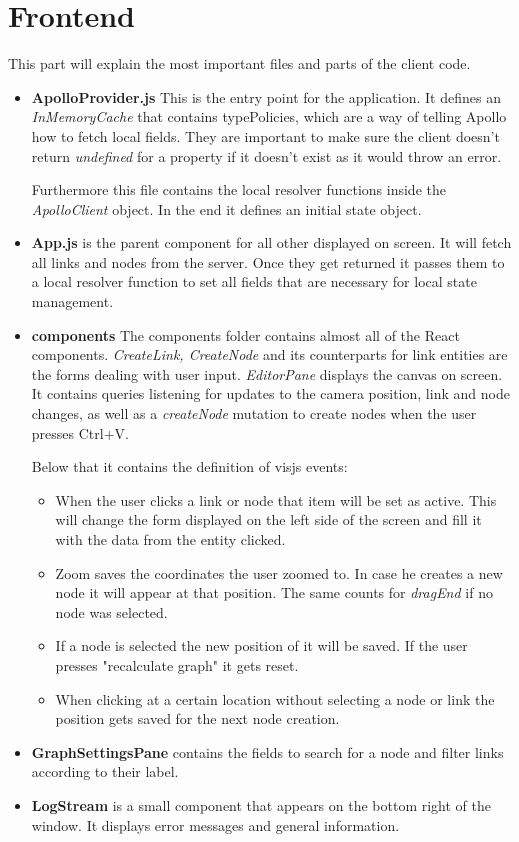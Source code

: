 \section{Frontend}
This part will explain the most important files and parts of the client code.
\begin{itemize}
\item \textbf{ApolloProvider.js} This is the entry point for the application. It defines an \emph{InMemoryCache} that contains typePolicies, which are a way of telling Apollo how to fetch local fields. They are important to make sure the client doesn't return \emph{undefined} for a property if it doesn't exist as it would throw an error.

Furthermore this file contains the local resolver functions inside the \emph{ApolloClient} object. In the end it defines an initial state object.

\item \textbf{App.js} is the parent component for all other displayed on screen. It will fetch all links and nodes from the server. Once they get returned it passes them to a local resolver function to set all fields that are necessary for local state management.

\item \textbf{components} The components folder contains almost all of the React components. \emph{CreateLink, CreateNode} and its counterparts for link entities are the forms dealing with user input. \emph{EditorPane} displays the canvas on screen. It contains queries listening for updates to the camera position, link and node changes, as well as a \emph{createNode} mutation to create nodes when the user presses Ctrl+V.

Below that it contains the definition of visjs events:
\begin{itemize}
\item When the user clicks a link or node that item will be set as active. This will change the form displayed on the left side of the screen and fill it with the data from the entity clicked.
\item  Zoom saves the coordinates the user zoomed to.  In case he creates a new node it will appear at that position. The same counts for \emph{dragEnd} if no node was selected.
\item If a node is selected the new position of it will be saved. If the user presses "recalculate graph" it gets reset.
\item When clicking at a certain location without selecting a node or link the position gets saved for the next node creation.
\end{itemize}

\item \textbf{GraphSettingsPane} contains the fields to search for a node and filter links according to their label.

\item \textbf{LogStream} is a small component that appears on the bottom right of the window. It displays error messages and general information.
\end{itemize}

